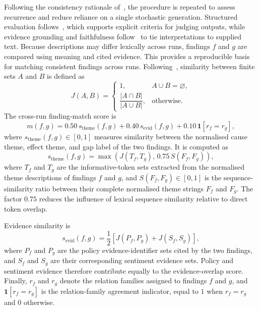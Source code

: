 Following the consistency rationale of~\cite{wang2023selfconsistency}, the procedure
is repeated to assess recurrence and reduce reliance on a single stochastic
generation. Structured evaluation follows~\cite{liu2023geval}, which supports
explicit criteria for judging outputs, while evidence grounding and faithfulness
follow~\cite{es2024ragas} to tie interpretations to supplied text. Because
descriptions may differ lexically across runs, findings $f$ and $g$ are compared
using meaning and cited evidence. This provides a reproducible basis for matching
consistent findings across runs. Following~\cite{jaccard1901etude}, similarity
between finite sets $A$ and $B$ is defined as
\begin{equation}
J(A,B)
=
\begin{cases}
1, & A\cup B=\varnothing,\\[2pt]
\dfrac{|A\cap B|}{|A\cup B|}, & \text{otherwise}.
\end{cases}
\label{eq:method-agent-jaccard}
\end{equation}
The cross-run finding-match score is
\begin{equation}
m(f,g)
=
0.50\,s_{\mathrm{theme}}(f,g)
+
0.40\,s_{\mathrm{evid}}(f,g)
+
0.10\,\mathbf{1}[r_f=r_g],
\label{eq:method-agent-match}
\end{equation}
where $s_{\mathrm{theme}}(f,g){\in}[0,1]$ measures similarity between the
normalised cause theme, effect theme, and gap label of the two findings. It is
computed as
\begin{equation}
s_{\mathrm{theme}}(f,g)
=
\max\!\left(
J(T_f,T_g),
\,0.75\,S(F_f,F_g)
\right),
\label{eq:method-agent-theme}
\end{equation}
where $T_f$ and $T_g$ are the informative-token sets extracted from the normalised
theme descriptions of findings $f$ and $g$, and
$S(F_f,F_g){\in}[0,1]$ is the sequence-similarity ratio between their complete
normalised theme strings $F_f$ and $F_g$. The factor $0.75$ reduces the influence
of lexical sequence similarity relative to direct token overlap. 

Evidence similarity is
\begin{equation}
s_{\mathrm{evid}}(f,g)
=
\frac{1}{2}
\left[
J(P_f,P_g)+J(S_f,S_g)
\right],
\label{eq:method-agent-evidence}
\end{equation}
where $P_f$ and $P_g$ are the policy evidence-identifier sets cited by the two
findings, and $S_f$ and $S_g$ are their corresponding sentiment evidence sets.
Policy and sentiment evidence therefore contribute equally to the evidence-overlap
score. Finally, $r_f$ and $r_g$ denote the relation families assigned to findings $f$
and $g$, and $\mathbf{1}[r_f=r_g]$ is the relation-family agreement indicator,
equal to $1$ when $r_f=r_g$ and $0$ otherwise.

